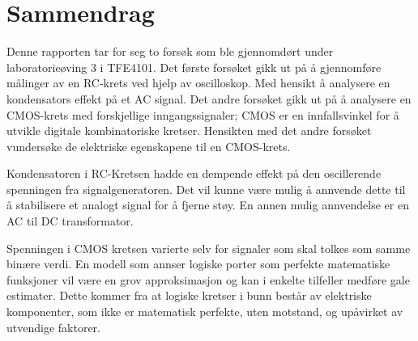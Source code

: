 \section{Sammendrag}

    Denne rapporten tar for seg to forsøk  som ble gjennomdørt under laboratorieøving 3 i TFE4101. Det første forsøket gikk ut på å gjennomføre målinger av en RC-krets ved hjelp av oscilloskop.
    Med hensikt å analysere en kondensators effekt på et AC signal.
    Det andre forsøket gikk ut på å analysere en CMOS-krets med forskjellige inngangssignaler;
    CMOS er en innfallsvinkel for å utvikle digitale kombinatoriske kretser. Hensikten med det andre forsøket vundersøke de elektriske egenskapene til en CMOS-krets.

    Kondensatoren i RC-Kretsen hadde en dempende effekt på den oscillerende spenningen fra signalgeneratoren. Det vil kunne være mulig å annvende dette til å stabilisere et analogt signal for å fjerne støy. En annen mulig annvendelse er en AC til DC transformator.

    Spenningen i CMOS kretsen varierte selv for signaler som skal tolkes som samme binære verdi. En modell som annser logiske porter som perfekte matematiske funksjoner vil være en grov approksimasjon og kan i enkelte tilfeller medføre gale estimater. Dette kommer fra at logiske kretser i bunn består av elektriske komponenter, som ikke er matematisk perfekte, uten motstand, og upåvirket av utvendige faktorer. 